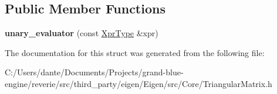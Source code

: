 \subsection*{Public Member Functions}
\begin{DoxyCompactItemize}
\item 
\mbox{\label{struct_eigen_1_1internal_1_1unary__evaluator_3_01_triangular_view_3_01_matrix_type_00_01_mode_01_4_00_01_index_based_01_4_af39191a25a16e28e69f61de2fc305808}} 
{\bfseries unary\+\_\+evaluator} (const \mbox{\hyperlink{class_eigen_1_1_triangular_view}{Xpr\+Type}} \&xpr)
\end{DoxyCompactItemize}


The documentation for this struct was generated from the following file\+:\begin{DoxyCompactItemize}
\item 
C\+:/\+Users/dante/\+Documents/\+Projects/grand-\/blue-\/engine/reverie/src/third\+\_\+party/eigen/\+Eigen/src/\+Core/Triangular\+Matrix.\+h\end{DoxyCompactItemize}
